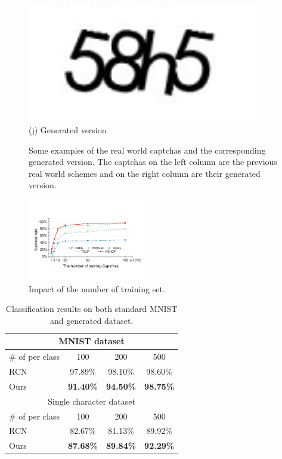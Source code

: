 \begin{figure}
{\begin{minipage}[t]{0.2\textwidth}
        \includegraphics[width=0.9\textwidth]{fig/generate_captchas/baidu_generator.png}\\
        \center (j) Generated version
    \end{minipage}
    }
  \caption{Some examples of the real world captchas and the corresponding generated version. The captchas on the left column are the previous real world schemes and on the right column are their generated version.}
  \label{fig: generate_show}
\end{figure}

\begin{figure}
  \centering
  \includegraphics[width=0.45\textwidth]{fig/training_set.pdf}
  \caption{Impact of the number of training set.}
  \label{fig: training_set}
\end{figure}

\begin{table}[t]
    \centering
    \caption{Classification results on both standard MNIST and generated dataset.}
    \label{table: mnist}
    \begin{tabular}{lccc}
        \toprule
        \multicolumn{4}{c}{MNIST dataset} \\
        \midrule
        \# of per class & 100  & 200 & 500\\
        \midrule
        RCN & 97.89\% & 98.10\% & 98.60\% \\
        Ours & \textbf{91.40\%} & \textbf{94.50\%} & \textbf{98.75\%} \\
        \toprule
        \multicolumn{4}{c}{Single character dataset} \\
        \midrule
        \# of per class & 100  & 200 & 500\\
        \midrule
        RCN & 82.67\% & 81.13\% & 89.92\% \\
        Ours & \textbf{87.68\%} & \textbf{89.84\%} & \textbf{92.29\%} \\
        \bottomrule
    \end{tabular}
\end{table}

